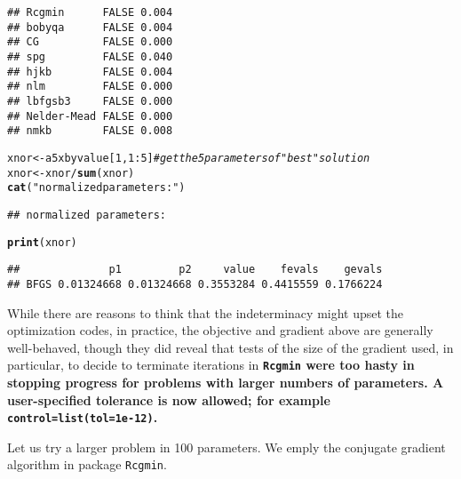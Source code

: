 \documentclass[11pt]{article}\usepackage[]{graphicx}\usepackage[]{color}
\makeatletter
\newcommand{\hlnum}[1]{\textcolor[rgb]{0.686,0.059,0.569}{#1}}%
\newcommand{\hlstr}[1]{\textcolor[rgb]{0.192,0.494,0.8}{#1}}%
\newcommand{\hlcom}[1]{\textcolor[rgb]{0.678,0.584,0.686}{\textit{#1}}}%
\newcommand{\hlopt}[1]{\textcolor[rgb]{0,0,0}{#1}}%
\newcommand{\hlstd}[1]{\textcolor[rgb]{0.345,0.345,0.345}{#1}}%
\newcommand{\hlkwb}[1]{\textcolor[rgb]{0.69,0.353,0.396}{#1}}%
\newcommand{\hlkwd}[1]{\textcolor[rgb]{0.737,0.353,0.396}{\textbf{#1}}}%
\newenvironment{kframe}{%
 \def\at@end@of@kframe{}%
 \ifinner\ifhmode%
  \def\at@end@of@kframe{\end{minipage}}%
  \begin{minipage}{\columnwidth}%
 \fi\fi%
 \def\FrameCommand##1{\hskip\@totalleftmargin \hskip-\fboxsep
 \colorbox{shadecolor}{##1}\hskip-\fboxsep
     \hskip-\linewidth \hskip-\@totalleftmargin \hskip\columnwidth}%
 \MakeFramed {\advance\hsize-\width
   \@totalleftmargin\z@ \linewidth\hsize
   \@setminipage}}%
 {\par\unskip\endMakeFramed%
 \at@end@of@kframe}
\newenvironment{knitrout}{}{} %
\newcommand{\code}[1]{{\tt#1}}
\newcommand{\pkg}[1]{\bf{\tt#1}\rm }
\makeatother
\begin{document}
\begin{knitrout}
\begin{kframe}
\begin{verbatim}
## Rcgmin      FALSE 0.004
## bobyqa      FALSE 0.004
## CG          FALSE 0.000
## spg         FALSE 0.040
## hjkb        FALSE 0.004
## nlm         FALSE 0.000
## lbfgsb3     FALSE 0.000
## Nelder-Mead FALSE 0.000
## nmkb        FALSE 0.008
\end{verbatim}
\begin{alltt}
\hlstd{xnor}\hlkwb{<-}\hlstd{a5xbyvalue[}\hlnum{1}\hlstd{,} \hlnum{1}\hlopt{:}\hlnum{5}\hlstd{]} \hlcom{# get the 5 parameters of "best" solution}
\hlstd{xnor}\hlkwb{<-}\hlstd{xnor}\hlopt{/}\hlkwd{sum}\hlstd{(xnor)}
\hlkwd{cat}\hlstd{(}\hlstr{"normalized parameters:"}\hlstd{)}
\end{alltt}
\begin{verbatim}
## normalized parameters:
\end{verbatim}
\begin{alltt}
\hlkwd{print}\hlstd{(xnor)}
\end{alltt}
\begin{verbatim}
##              p1         p2     value    fevals    gevals
## BFGS 0.01324668 0.01324668 0.3553284 0.4415559 0.1766224
\end{verbatim}
\end{kframe}
\end{knitrout}


While there are reasons to think that the indeterminacy
might upset the optimization codes, in practice, the objective 
and gradient above are generally
well-behaved, though they did reveal that tests of the size 
of the gradient used, in particular, to
decide to terminate iterations in \pkg{Rcgmin} were too 
hasty in stopping progress for problems
with larger numbers of parameters. A user-specified tolerance is now allowed; for
example \code{control=list(tol=1e-12)}. 

Let us try a larger problem in 100 parameters. We emply the conjugate gradient
algorithm in package \code{Rcgmin}.
\end{document}
